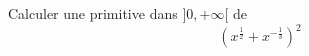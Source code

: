 Calculer une primitive dans $]0,+\infty[$ de 
\begin{displaymath}
 \left( x^{\frac{1}{2}}+x^{-\frac{1}{3}}\right)^2 
\end{displaymath}

\bigskip